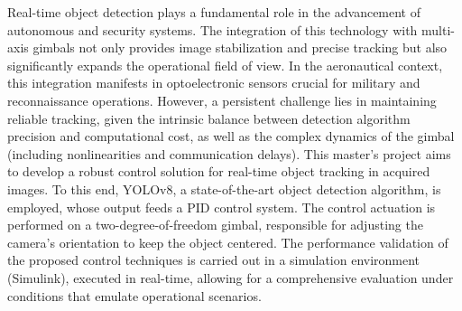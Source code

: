 \begin{flushleft}
	Real-time object detection plays a fundamental role in the advancement of autonomous and security systems. The integration of this technology with multi-axis gimbals not only provides image stabilization and precise tracking but also significantly expands the operational field of view. In the aeronautical context, this integration manifests in optoelectronic sensors crucial for military and reconnaissance operations. However, a persistent challenge lies in maintaining reliable tracking, given the intrinsic balance between detection algorithm precision and computational cost, as well as the complex dynamics of the gimbal (including nonlinearities and communication delays).
	This master's project aims to develop a robust control solution for real-time object tracking in acquired images. To this end, YOLOv8, a state-of-the-art object detection algorithm, is employed, whose output feeds a PID control system. The control actuation is performed on a two-degree-of-freedom gimbal, responsible for adjusting the camera's orientation to keep the object centered. The performance validation of the proposed control techniques is carried out in a simulation environment (Simulink), executed in real-time, allowing for a comprehensive evaluation under conditions that emulate operational scenarios.
\end{flushleft}


